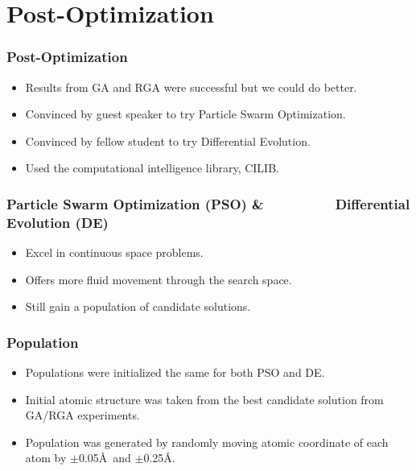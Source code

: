 \documentclass[10pt]{beamer}
\begin{document}
\section{Post-Optimization}

\begin{frame}
	\frametitle{Post-Optimization}

	\begin{itemize}
		\item Results from GA and RGA were successful but we could do better.
		\item Convinced by guest speaker to try Particle Swarm Optimization.
		\item Convinced by fellow student to try Differential Evolution.
		\item Used the computational intelligence library, CILIB.
	\end{itemize}
\end{frame}

\begin{frame}
	\frametitle{Particle Swarm Optimization (PSO) \& \,\,\,\,\,\,\,\,\,\,\,\,\,\,\,\,\,\,\,\,\,\,\,\,\,\,\,\, Differential Evolution (DE)}

	\begin{itemize}
		\item Excel in continuous space problems.
		\item Offers more fluid movement through the search space.
		\item Still gain a population of candidate solutions.
	\end{itemize}
\end{frame}

\begin{frame}
	\frametitle{Population}

	\begin{itemize}
		\item Populations were initialized the same for both PSO and DE.
		\item Initial atomic structure was taken from the best candidate solution from GA/RGA experiments.
		\item Population was generated by randomly moving atomic coordinate of each atom by $\pm$0.05\AA\ and $\pm$0.25\AA.
	\end{itemize}

\end{frame}
\end{document}
